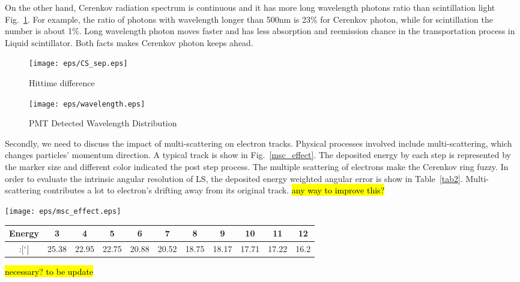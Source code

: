 \documentclass[a4paper,10pt]{cpc-hepnp}
\begin{document}
On the other hand, Cerenkov radiation spectrum is continuous and it has more
long wavelength
photons ratio than scintillation light Fig.~\ref{figwavelength}. 
For example, the ratio of photons with wavelength longer than 500nm is 23\% 
for Cerenkov photon, while for scintillation the number is about 1\%.
Long wavelength photon moves faster and has less absorption
and reemission chance in the transportation process in Liquid scintillator.
Both facts makes Cerenkov photon keeps ahead.
\begin{figure}[htbp]
\centering
\begin{minipage}{0.5\textwidth}
\centering
\texttt{[image: eps/CS\_sep.eps]}
\label{figCS_sep}
\caption{Hittime difference}
\end{minipage}%
\begin{minipage}{0.5\textwidth}
\centering
\texttt{[image: eps/wavelength.eps]}
\label{figwavelength}
\caption{PMT Detected Wavelength Distribution}
\end{minipage}
\end{figure}

Secondly, we need to discuss the impact of multi-scattering on electron tracks.
Physical processes involved include multi-scattering, which changes
particles' momentum direction. A typical track is show in
Fig.~\ref{msc_effect}. The deposited energy by each step is
represented by the marker size and different color indicated the post step
process. The multiple scattering of electrons make the Cerenkov ring fuzzy. In order to
evaluate the intrinsic angular resolution of LS, the deposited energy weighted
angular error is show in Table~\ref{tab2}. Multi-scattering
contributes a lot to electron's drifting away from its original track.
\hl{any way to improve this?}
\begin{center}
\texttt{[image: eps/msc\_effect.eps]}
\end{center}


\begin{center}
\footnotesize
\begin{tabular*}{170mm}{@{\extracolsep{\fill}}ccccccccccc}
\toprule Energy&3&4&5&6&7&8&9&10&11&12\\
\hline
:[$^{\circ}$]&25.38&22.95&22.75&20.88&20.52&18.75&18.17&17.71&17.22&16.2\\
\bottomrule
\end{tabular*}
\end{center}
\hl{necessary? to be update}
\end{document}
